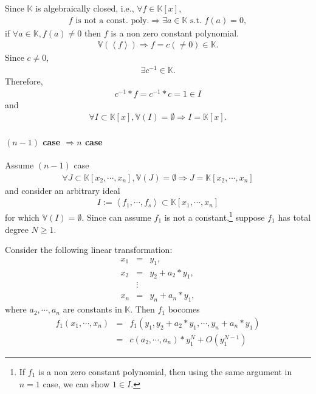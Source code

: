 \documentclass[11pt]{book}
\begin{document}
Since $\mathbb{K}$ is algebraically closed, i.e., $\forall f \in \mathbb{K}[x]$,
\begin{eqnarray}
\text{$f$ is not a const. poly.} \Rightarrow \exists a \in \mathbb{K} \text{ s.t. } f(a) = 0,
\end{eqnarray}
if $\forall a \in \mathbb{K}, f(a) \neq 0$ then $f$ is a non zero constant polynomial.
\begin{eqnarray}
\mathbb{V}(\left< f\right>) \Rightarrow f = c (\neq 0) \in \mathbb{K}.
\end{eqnarray}
Since $c \neq 0$, 
\begin{eqnarray}
\exists c^{-1} \in \mathbb{K}.
\end{eqnarray}
Therefore,
\begin{eqnarray}
c^{-1} * f = c^{-1} * c = 1 \in I
\end{eqnarray}
and 
\begin{eqnarray}
\forall I \subset \mathbb{K}[x], \mathbb{V}(I) = \emptyset \Rightarrow I = \mathbb{K}[x].
\end{eqnarray}

\paragraph{$(n-1)$ case $\Rightarrow n$ case}
Assume $(n-1)$ case
\begin{eqnarray}
\forall J \subset \mathbb{K}[x_2, \cdots, x_n], \mathbb{V}(J) = \emptyset \Rightarrow J = \mathbb{K}[x_2, \cdots, x_n]
\end{eqnarray}
and consider an arbitrary ideal
\begin{eqnarray}
I := \left< f_1, \cdots, f_s \right> \subset \mathbb{K}[x_1, \cdots, x_n]
\end{eqnarray}
for which $\mathbb{V}(I) = \emptyset $.
Since can assume $f_1$ is not a constant,\footnote{
If $f_1$ is a non zero constant polynomial, then using the same argument in $n=1$ case, we can show $1 \in I$.
} suppose $f_1$ has total degree $N \geq 1$.

Consider the following linear transformation:
\begin{eqnarray}
\nonumber
x_1 &=& y_1, \\
\nonumber
x_2 &=& y_2 + a_2*y_1, \\
\nonumber
&\vdots&\\
\label{LinearTransformInHWN}
x_n &=& y_n + a_n*y_1,
\end{eqnarray}
where $a_2, \cdots, a_n$ are constants in $\mathbb{K}$.
Then $f_1$ bocomes
\begin{eqnarray}
f_1(x_1, \cdots, x_n) &=& f_1(y_1, y_2 + a_2*y_1, \cdots, y_n + a_n*y_1) \\
&=& c(a_2, \cdots, a_n) * y_1^N + O(y_1^{N-1})
\end{eqnarray}
\end{document}
